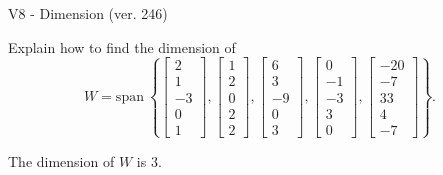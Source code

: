 \begin{exercise}
  \begin{exerciseTitle}V8 - Dimension (ver. 246)\end{exerciseTitle}
  \begin{exerciseStatement}
    Explain how to find the dimension of 
\[W=\mathrm{span}\ \left\{\left[\begin{array}{r}
2 \\
1 \\
-3 \\
0 \\
1
\end{array}\right] , \left[\begin{array}{r}
1 \\
2 \\
0 \\
2 \\
2
\end{array}\right] , \left[\begin{array}{r}
6 \\
3 \\
-9 \\
0 \\
3
\end{array}\right] , \left[\begin{array}{r}
0 \\
-1 \\
-3 \\
3 \\
0
\end{array}\right] , \left[\begin{array}{r}
-20 \\
-7 \\
33 \\
4 \\
-7
\end{array}\right]\right\}.\]



  \end{exerciseStatement}
  \begin{exerciseAnswer}
   The dimension of \(W\) is  \(3\).
  


  \end{exerciseAnswer}
\end{exercise}